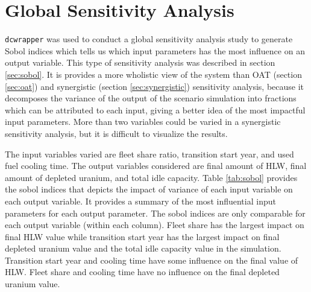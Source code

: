 \section{Global Sensitivity Analysis}
\texttt{dcwrapper} was used to conduct a global sensitivity 
analysis study to generate Sobol indices which tells us which 
input parameters has the most influence on an output variable. 
This type of sensitivity analysis was described in 
section \ref{sec:sobol}. 
It is provides a more wholistic view of the system 
than OAT (section \ref{sec:oat}) and 
synergistic (section \ref{sec:synergistic}) sensitivity 
analysis, because it decomposes the variance of the 
output of the scenario simulation into fractions which can be 
attributed to each input, giving a better idea of the
most impactful input parameters. 
More than two variables could be varied in a synergistic
sensitivity analysis, but it is difficult to visualize the 
results. 

The input variables varied are fleet share ratio, 
transition start year, and used fuel cooling time.
The output variables considered are final amount of HLW, 
final amount of depleted uranium, and total idle capacity. 
Table \ref{tab:sobol} provides the sobol indices that depicts 
the impact of variance of each input variable on each output 
variable. 
It provides a summary of the most influential input parameters 
for each output parameter. 
The sobol indices are only comparable for each output variable 
(within each column). 
Fleet share has the largest impact on 
final HLW value while transition start year has the largest 
impact on final depleted uranium value and the total idle 
capacity value in the simulation. 
Transition start year and cooling time have some influence on 
the final value of HLW. 
Fleet share and cooling time have no influence on the final 
depleted uranium value. 
    
